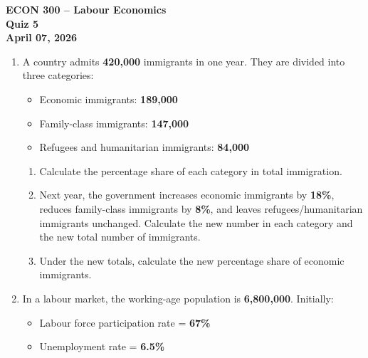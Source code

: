 \documentclass[12pt]{article}
\begin{document}
\begin{center}
\Large \textbf{ECON 300 -- Labour Economics} \vspace{.5cm}\\
\large \textbf{Quiz 5} \vspace{.5cm}\\
\large \textbf{April 07, 2026}
\end{center}

\begin{enumerate}



\item A country admits \textbf{420,000} immigrants in one year. They are divided into three categories:

\begin{itemize}
    \item Economic immigrants: \textbf{189,000}
    \item Family-class immigrants: \textbf{147,000}
    \item Refugees and humanitarian immigrants: \textbf{84,000}
\end{itemize}


\begin{enumerate}[label=(\alph*)]
    \item Calculate the percentage share of each category in total immigration. \hfill 

    \item Next year, the government increases economic immigrants by \textbf{18\%}, reduces family-class immigrants by \textbf{8\%}, and leaves refugees/humanitarian immigrants unchanged. Calculate the new number in each category and the new total number of immigrants. \hfill 

    \item Under the new totals, calculate the new percentage share of economic immigrants. \hfill 
\end{enumerate}



\item In a labour market, the working-age population is \textbf{6,800,000}. Initially:

\begin{itemize}
    \item Labour force participation rate = \textbf{67\%}
    \item Unemployment rate = \textbf{6.5\%}
\end{itemize}




\end{enumerate}
\end{document}
